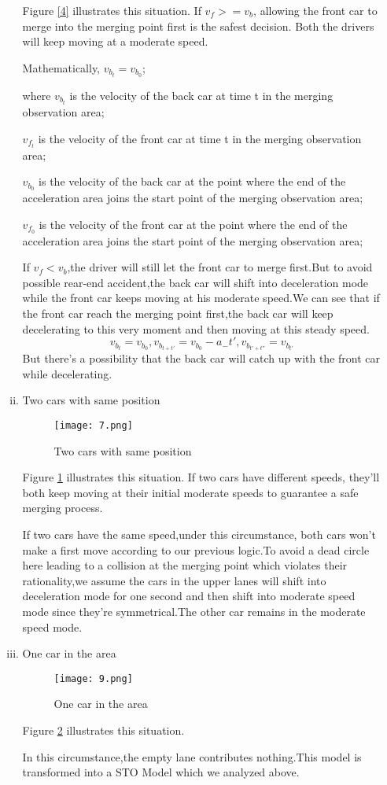 \begin{itemize}
\begin{enumerate}[i)]
	Figure \ref{4} illustrates this situation.
		If $v_f>=v_b$, allowing the front car to merge into the merging point first is the safest decision. Both the drivers will keep moving at a moderate speed.

   Mathematically, $v_{b_t}=v_{b_0}$;

   where $v_{b_t}$ is the velocity of the back car at time t in the merging observation area;

	$v_{f_t}$ is the velocity of the front car at time t in the merging observation area;

    $v_{b_0}$ is the velocity of the back car at the point where the end of the acceleration area joins the start point of the merging observation area;

    $v_{f_0}$ is the velocity of the front car at the point where the end of the acceleration area joins the start point of the merging observation area;

	If $v_f<v_b$,the driver will still let the front car to merge first.But to avoid possible rear-end accident,the back car will shift into deceleration mode while the front car keeps moving at his moderate speed.We can see that if the front car reach the merging point first,the back car will keep decelerating to this very moment and then moving at this steady speed.
 	 $$v_{b_t}=v_{b_0},v_{b_{t+t'}}=v_{b_0}-a_-t',v_{b_{t'+t''}}=v_{b_{t'}}$$
	But there's a possibility that the back car will catch up with the front car while decelerating.

	\item
	Two cars with same position
	\begin{figure}[h]
	\centering
	\texttt{[image: 7.png]}
	\caption{Two cars with same position}
	\label{5}
	\end{figure}

	Figure \ref{5} illustrates this situation.
	If two cars have different speeds, they'll both keep moving at their initial moderate speeds to guarantee a safe merging process.

	If two cars have the same speed,under this circumstance, both cars won't make a first move according to our previous logic.To avoid a dead circle here leading to a collision at the merging point which violates their rationality,we assume the cars in the upper lanes will shift into deceleration mode for one second and then shift into moderate speed mode since they're symmetrical.The other car remains in the moderate speed mode.

	\item
	One car in the area
	\begin{figure}[h]
	\centering
	\texttt{[image: 9.png]}
	\caption{One car in the area}
	\label{6}
	\end{figure}
	Figure \ref{6} illustrates this situation.

	In this circumstance,the empty lane contributes nothing.This model is transformed into a STO Model which we analyzed above.

	\end{enumerate}
\end{itemize}

